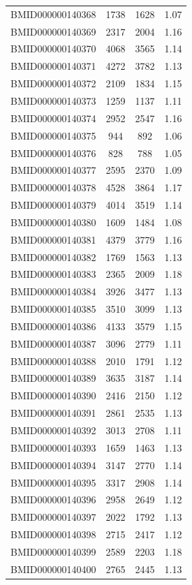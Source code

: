 \documentclass{bmcart}
\begin{document}
\begin{backmatter}
\begin{center}
\begin{longtable}{c|c|c|c}
BMID000000140368 & 1738 & 1628 & 1.07 \\
BMID000000140369 & 2317 & 2004 & 1.16 \\
BMID000000140370 & 4068 & 3565 & 1.14 \\
BMID000000140371 & 4272 & 3782 & 1.13 \\
BMID000000140372 & 2109 & 1834 & 1.15 \\
BMID000000140373 & 1259 & 1137 & 1.11 \\
BMID000000140374 & 2952 & 2547 & 1.16 \\
BMID000000140375 & 944 & 892 & 1.06 \\
BMID000000140376 & 828 & 788 & 1.05 \\
BMID000000140377 & 2595 & 2370 & 1.09 \\
BMID000000140378 & 4528 & 3864 & 1.17 \\
BMID000000140379 & 4014 & 3519 & 1.14 \\
BMID000000140380 & 1609 & 1484 & 1.08 \\
BMID000000140381 & 4379 & 3779 & 1.16 \\
BMID000000140382 & 1769 & 1563 & 1.13 \\
BMID000000140383 & 2365 & 2009 & 1.18 \\
BMID000000140384 & 3926 & 3477 & 1.13 \\
BMID000000140385 & 3510 & 3099 & 1.13 \\
BMID000000140386 & 4133 & 3579 & 1.15 \\
BMID000000140387 & 3096 & 2779 & 1.11 \\
BMID000000140388 & 2010 & 1791 & 1.12 \\
BMID000000140389 & 3635 & 3187 & 1.14 \\
BMID000000140390 & 2416 & 2150 & 1.12 \\
BMID000000140391 & 2861 & 2535 & 1.13 \\
BMID000000140392 & 3013 & 2708 & 1.11 \\
BMID000000140393 & 1659 & 1463 & 1.13 \\
BMID000000140394 & 3147 & 2770 & 1.14 \\
BMID000000140395 & 3317 & 2908 & 1.14 \\
BMID000000140396 & 2958 & 2649 & 1.12 \\
BMID000000140397 & 2022 & 1792 & 1.13 \\
BMID000000140398 & 2715 & 2417 & 1.12 \\
BMID000000140399 & 2589 & 2203 & 1.18 \\
BMID000000140400 & 2765 & 2445 & 1.13 \\

\end{longtable}
\end{center}
\end{backmatter}
\end{document}
